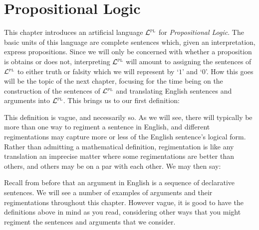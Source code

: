 \chapter{Propositional Logic}
  \label{ch.PL-syntax}


This chapter introduces an artificial language $\mathcal{L}^{\textsc{pl}}$ for \textit{Propositional Logic}.
The basic units of this language are complete sentences which, given an interpretation, express propositions.
Since we will only be concerned with whether a proposition is obtains or does not, interpreting $\mathcal{L}^{\textsc{pl}}$ will amount to assigning the sentences of $\mathcal{L}^{\textsc{pl}}$ to either truth or falsity which we will represent by `$1$' and `$0$'.
How this goes will be the topic of the next chapter, focusing for the time being on the construction of the sentences of $\mathcal{L}^{\textsc{pl}}$ and translating English sentences and arguments into $\mathcal{L}^{\textsc{pl}}$.
This brings us to our first definition: 
  

This definition is vague, and necessarily so.
As we will see, there will typically be more than one way to regiment a sentence in English, and different regimentations may capture more or less of the English sentence's logical form.
Rather than admitting a mathematical definition, regimentation is like any translation an imprecise matter where some regimentations are better than others, and others may be on a par with each other.
We may then say:


Recall from before that an argument in English is a sequence of declarative sentences.
We will see a number of examples of arguments and their regimentations throughout this chapter.
However vague, it is good to have the definitions above in mind as you read, considering other ways that you might regiment the sentences and arguments that we consider.




